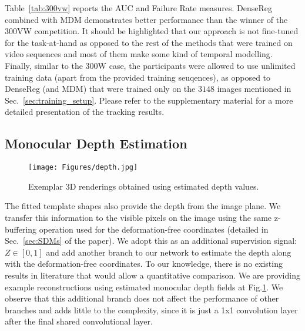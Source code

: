 \documentclass[10pt,twocolumn,letterpaper]{article}
\begin{document}
Table~\ref{tab:300vw} reports the AUC and Failure Rate measures. DenseReg combined with MDM demonstrates better performance than the winner of the 300VW competition. It should be highlighted that our approach is not fine-tuned for the task-at-hand as opposed to the rest of the methods that were trained on video sequences and most of them make some kind of temporal modelling. Finally, similar to the 300W case, the participants were allowed to use unlimited training data (apart from the provided training seuqences), as opposed to DenseReg (and MDM) that were trained only on the $3148$ images mentioned in Sec.~\ref{sec:training_setup}. 
Please refer to the supplementary material for a more detailed presentation of the tracking results.

\subsection{Monocular Depth Estimation}\label{sec:exp_depth}\begin{figure}[!h]
\centering
\texttt{[image: Figures/depth.jpg]}
\caption{Exemplar 3D renderings obtained using estimated depth values.}
\label{fig:depth}
\vspace{-0.35cm}
\end{figure}The fitted template shapes also provide the depth from the image plane. We transfer this information to the visible pixels on the image using the same z-buffering operation used for the deformation-free coordinates (detailed in Sec.~\ref{sec:SDMs}  of the paper). We adopt this as an additional supervision signal: $Z \in [0,1]$ and add another branch to our network to estimate the depth along with the deformation-free coordinates. To our knowledge, there is no existing results in literature that would allow a quantitative comparison. We are 
providing example reconstructions using estimated monocular depth fields at Fig.\ref{fig:depth}.  We observe that this additional branch does not affect the performance of other branches and adds little to the complexity, since it is just a 1x1 convolution layer after the final shared convolutional layer. 

\end{document}
